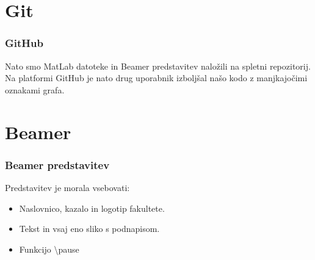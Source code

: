 \documentclass{beamer}
\begin{document}
\section{Git}

\begin{frame}
\frametitle{GitHub}
\justifying
Nato smo MatLab datoteke in Beamer predstavitev naložili na spletni repozitorij. Na platformi GitHub je nato drug uporabnik izboljšal našo kodo z manjkajočimi oznakami grafa.
\end{frame}

\section{Beamer}

\begin{frame}
\frametitle{Beamer predstavitev}
Predstavitev je morala vsebovati:
\begin{itemize}
    \item Naslovnico, kazalo in logotip fakultete.
    \pause
    \item Tekst in vsaj eno sliko s podnapisom.
    \pause
    \item Funkcijo \textbackslash pause
\end{itemize}
\end{frame}
\end{document}
